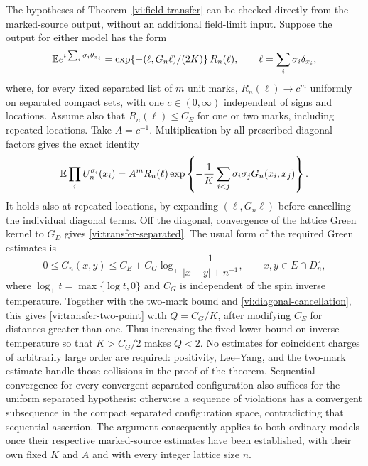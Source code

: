 \begin{remark}
\label{vi:transfer-interface}
The hypotheses of Theorem~\ref{vi:field-transfer} can be checked directly
from the marked-source output, without an additional field-limit input.
Suppose the output for either model has the form
\[
 \mathbb E e^{i\sum_i\sigma_i\theta_{x_i}}
 =\exp\{- (\ell,G_n\ell)/(2K)\}\,R_n(\ell),\qquad
 \ell=\sum_i\sigma_i\delta_{x_i},
\]
where, for every fixed separated list of $m$ unit marks,
$R_n(\ell)\to c^m$ uniformly on separated compact sets, with one
$c\in(0,\infty)$ independent of signs and locations.
Assume also that $R_n(\ell)\leq C_E$ for one or two marks, including
repeated locations.  Take $A=c^{-1}$.
Multiplication by all prescribed diagonal factors gives the exact identity
\begin{equation}\label{vi:diagonal-cancellation}
 \mathbb E\prod_i U_n^{\sigma_i}(x_i)
 =A^mR_n(\ell)
       \exp\left\{-\frac1K\sum_{i<j}\sigma_i\sigma_j
                                    G_n(x_i,x_j)\right\}.
\end{equation}
It holds also at repeated locations, by expanding $(\ell,G_n\ell)$
before cancelling the individual diagonal terms.
Off the diagonal, convergence of the lattice Green kernel to $G_D$ gives
\eqref{vi:transfer-separated}.
The usual form of the required Green estimates is
\[
 0\leq G_n(x,y)\leq C_E+C_G
             \log_+\frac1{|x-y|+n^{-1}},\qquad x,y\in E\cap D_n^\circ,
\]
where $\log_+t=\max\{\log t,0\}$ and $C_G$ is independent of the
spin inverse temperature.  Together with the two-mark bound and
\eqref{vi:diagonal-cancellation}, this gives
\eqref{vi:transfer-two-point} with $Q=C_G/K$, after modifying $C_E$
for distances greater than one.  Thus increasing the fixed lower bound
on inverse temperature so that $K>C_G/2$ makes $Q<2$.
No estimates for coincident charges of arbitrarily large order are
required: positivity, Lee--Yang, and the two-mark estimate handle those
collisions in the proof of the theorem.
Sequential convergence for every convergent separated configuration also
suffices for the uniform separated hypothesis: otherwise a sequence of
violations has a convergent subsequence in the compact separated
configuration space, contradicting that sequential assertion.
The argument consequently applies to both ordinary models once their
respective marked-source estimates have been established, with their own
fixed $K$ and $A$ and with every integer lattice size $n$.
\end{remark}



